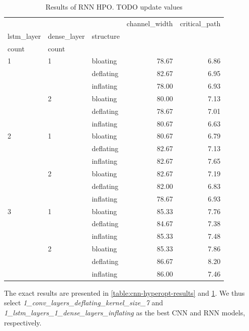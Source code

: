 \begin{table}
	\begin{tabular}{lllrr}
		\toprule
		&   &           &  channel\_width &  critical\_path \\
		lstm\_layer & dense\_layer & structure &                &                   \\
		count & count &  &                &                   \\
		\midrule
		1 & 1 & bloating &          78.67 &              6.86 \\
		&   & deflating &          82.67 &              6.95 \\
		&   & inflating &          78.00 &              6.93 \\
		& 2 & bloating &          80.00 &              7.13 \\
		&   & deflating &          78.67 &              7.01 \\
		&   & inflating &          80.67 &              6.63 \\
		2 & 1 & bloating &          80.67 &              6.79 \\
		&   & deflating &          82.67 &              7.13 \\
		&   & inflating &          82.67 &              7.65 \\
		& 2 & bloating &          82.67 &              7.19 \\
		&   & deflating &          82.00 &              6.83 \\
		&   & inflating &          78.67 &              6.93 \\
		3 & 1 & bloating &          85.33 &              7.76 \\
		&   & deflating &          84.67 &              7.38 \\
		&   & inflating &          85.33 &              7.48 \\
		& 2 & bloating &          85.33 &              7.86 \\
		&   & deflating &          86.67 &              8.20 \\
		&   & inflating &          86.00 &              7.46 \\
		\bottomrule
	\end{tabular}
	\caption{Results of \gls{RNN} HPO. TODO update values}
	\label{table:rnn-hyperopt-results}
\end{table}

The exact results are presented in \ref{table:cnn-hyperopt-results} and \ref{table:rnn-hyperopt-results}. We thus select \textit{1\_conv\_layers\_deflating\_kernel\_size\_7} and \textit{1\_lstm\_layers\_1\_dense\_layers\_inflating} as the best \gls{CNN} and \gls{RNN} models, respectively.

